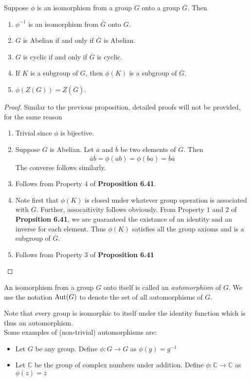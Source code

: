\begin{proposition}
	Suppose $\phi$ is an isomorphism from a group $G$ onto a group $\overline{G}$. Then
	\begin{enumerate}
		\item $\phi^{-1}$ is an isomorphism from $\overline{G}$ onto $G$.
		\item $G$ is Abelian if and only if $\overline{G}$ is Abelian.
		\item $G$ is cyclic if and only if $\overline{G}$ is cyclic.
		\item If $K$ is a subgroup of $G$, then $\phi(K)$ is a subgroup of $\overline{G}$.
		\item $\phi(Z(G))=Z(\overline{G})$.
	\end{enumerate}
\end{proposition}
\begin{proof}
	Similar to the previous proposition, detailed proofs will not be provided, for the same reason\\
	\begin{enumerate}
		\item Trivial since $\phi$ is bijective. 
		\item Suppose $G$ is Abelian. Let $\overline{a}$ and $\overline{b}$ be two elements of $\overline{G}$. Then
		$$
		\overline{a}\overline{b} = \phi(ab) = \phi(ba) = \overline{b}\overline{a}
		$$
		The converse follows similarly. 
		\item Follows from Property $4$ of \textbf{Proposition 6.41}.
		\item Note first that $\phi(K)$ is closed under whatever group operation is associated with $\overline{G}$. Further, assocaitivity follows obviously. From Property $1$ and $2$ of \textbf{Propsition 6.41}, we are guaranteed the existance of an identity and an inverse for each element. Thus $\phi(K)$ satisfies all the group axioms and is a subgroup of $\overline{G}$.
		\item Follows from Property 3 of \textbf{Proposition 6.41}
	\end{enumerate}
\end{proof}

\begin{definition}[Automorphism]
	An isomorphism from a group $G$ onto itself is called an \textit{automorphism} of $G$. We use the notation $\operatorname{Aut}(G)$ to denote the set of all automorphisms of $G$.
\end{definition}
Note that every group is isomorphic to itself under the identity function which is thus an automorphism.\\
Some examples of (non-trivial) automorphisms are:
\begin{itemize}
	\item Let $G$ be any group. Define $\phi:G\to G$ as $\phi(g)=g^{-1}$
	\item Let $\mathbb{C}$ be the group of complex numbers under addition. Define $\phi:\mathbb{C}\to\mathbb{C}$ as $\phi(z)=\overline{z}$
\end{itemize}

